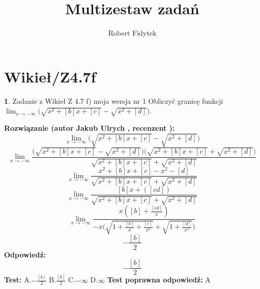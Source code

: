 \documentclass[12pt, a4paper]{article}
\title{Multizestaw zadań}
\author{Robert Fidytek}
\date{}
\theoremstyle{definition} %
\newtheorem{zad}{}
\newcommand{\kategoria}[1]{\section{#1}} %
\newcommand{\zadStart}[1]{\begin{zad}#1\newline} %
\newcommand{\zadStop}{\end{zad}}   %
\newcommand{\rozwStart}[2]{\noindent \textbf{Rozwiązanie (autor #1 , recenzent #2): }\newline} %
\newcommand{\rozwStop}{\newline}                                            %
\newcommand{\odpStart}{\noindent \textbf{Odpowiedź:}\newline}    %
\newcommand{\odpStop}{\newline}                                             %
\newcommand{\testStart}{\noindent \textbf{Test:}\newline} %
\newcommand{\testStop}{\newline} %
\newcommand{\kluczStart}{\noindent \textbf{Test poprawna odpowiedź:}\newline} %
\newcommand{\kluczStop}{\newline} %
\begin{document}
\maketitle


\kategoria{Wikieł/Z4.7f}
\zadStart{Zadanie z Wikieł Z 4.7 f) moja wersja nr 1}
Obliczyć granicę funkcji $\lim_{x \to -\infty}\big(\sqrt{x^{2}+[b]x+[c]}-\sqrt{x^{2}+[d]}\big)$.
\zadStop
\rozwStart{Jakub Ulrych}{}
$$\lim_{x \to -\infty}\big(\sqrt{x^{2}+[b]x+[c]}-\sqrt{x^{2}+[d]}\big)$$
$$\lim_{x \to -\infty}\frac{\big(\sqrt{x^{2}+[b]x+[c]}-\sqrt{x^{2}+[d]}\big)\big(\sqrt{x^{2}+[b]x+[c]}+\sqrt{x^{2}+[d]}\big)}{\sqrt{x^{2}+[b]x+[c]}+\sqrt{x^{2}+[d]}}$$
$$\lim_{x \to -\infty}\frac{x^{2}+[b]x+[c]-x^{2}-[d]}{\sqrt{x^{2}+[b]x+[c]}+\sqrt{x^{2}+[d]}}$$
$$\lim_{x \to -\infty}\frac{[b]x+([cd])}{\sqrt{x^{2}+[b]x+[c]}+\sqrt{x^{2}+[d]}}$$
$$\lim_{x \to -\infty}\frac{x([b]+\frac{[cd]}{x})}{-x\big(\sqrt{1+\frac{[b]}{x}+\frac{[c]}{x^{2}}}+\sqrt{1+\frac{[d]}{x^{2}}}\big)}$$
$$-\frac{[b]}{2}$$
\rozwStop
\odpStart
$$-\frac{[b]}{2}$$
\odpStop
\testStart
A.$-\frac{[b]}{2}$
B.$\frac{[b]}{2}$
C.$-\infty$
D.$\infty$
\testStop
\kluczStart
A
\kluczStop
\end{document}
